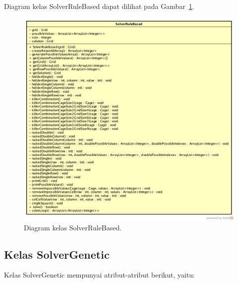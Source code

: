 Diagram kelas SolverRuleBased dapat dilihat pada Gambar~\ref{fig:diagramkelassolverrb}.

\begin{figure}
\centering
\captionsetup{justification=centering}
\includegraphics[scale=0.4]{Gambar/Perancangan/DiagramKelasSolverRuleBased.png}
\caption[Diagram kelas SolverRuleBased.]{Diagram kelas SolverRuleBased.}
\label{fig:diagramkelassolverrb}
\end{figure}

\subsection{Kelas SolverGenetic}
\label{sec:kelassolvergenetic}

Kelas SolverGenetic mempunyai atribut-atribut berikut, yaitu:

